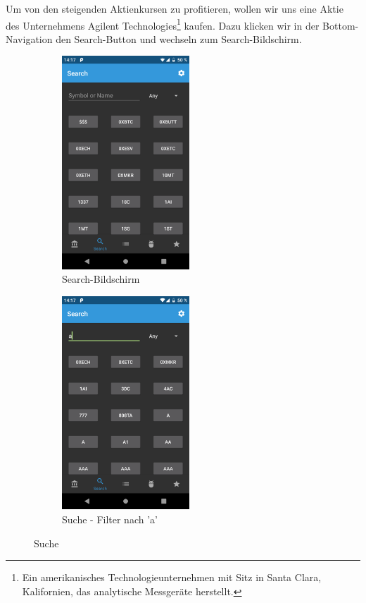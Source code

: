 \documentclass[a4paper]{article}
\begin{document}
 Um von den steigenden Aktienkursen zu profitieren, wollen wir uns eine Aktie des Unternehmens Agilent Technologies\footnote{Ein amerikanisches Technologieunternehmen mit Sitz in Santa Clara, Kalifornien, das analytische Messgeräte herstellt.} kaufen. Dazu klicken wir in der Bottom-Navigation den Search-Button und wechseln zum Search-Bildschirm.

\begin{figure}[H]
	\begin{subfigure}{.5\textwidth}
		\centering
		\includegraphics[height=8cm,keepaspectratio]{./images/demo/search.png}
		\caption{Search-Bildschirm}
		\label{fig:demo:search_screen}
	\end{subfigure}
	\begin{subfigure}{.5\textwidth}
		\centering
		\includegraphics[height=8cm,keepaspectratio]{./images/demo/search_a.png}
		\caption{Suche - Filter nach 'a'}
		\label{fig:demo:search_a}
	\end{subfigure}
	\caption{Suche}
	\label{fig:demo:search}
\end{figure}
\end{document}
